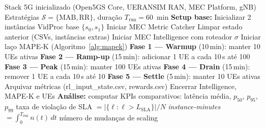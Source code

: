

\begin{algorithm}[t]
\caption{Procedimento experimental para comparação MAB vs.\ Round Robin}
\label{alg:experiment}
\begin{algorithmic}[1]
\Require Stack 5G inicializado (Open5GS Core, UERANSIM RAN, MEC Platform, gNB)
\Require Estratégias $\mathcal{S} = \{\text{MAB}, \text{RR}\}$, duração $T_{\text{run}} = 60$~min
\Statex
\State \textbf{Setup base:}
\State Inicializar 2 instâncias VidProc base $\{s_0, s_1\}$
\State Iniciar MEC Metric Catcher
\Statex
{}
    \State Limpar estado anterior (CSVs, instâncias extras)
    \State Iniciar MEC Intelligence com roteador $\sigma$
    \State Iniciar laço MAPE-K (Algoritmo~\ref{alg:mapek})
    \Statex
    \State \textbf{Fase 1 — Warmup} (10\,min): manter 10 UEs ativas
    \State \textbf{Fase 2 — Ramp-up} (15\,min): adicionar 1 UE a cada 10\,s até 100
    \State \textbf{Fase 3 — Peak} (15\,min): manter 100 UEs ativas
    \State \textbf{Fase 4 — Drain} (15\,min): remover 1 UE a cada 10\,s até 10
    \State \textbf{Fase 5 — Settle} (5\,min): manter 10 UEs ativas
    \Statex
    \State Arquivar métricas (rl\_input\_state.csv, rewards.csv)
    \State Encerrar Intelligence, MAPE-K e UEs
\EndFor
\Statex
\State \textbf{Análise:} computar KPIs comparativos:
\State \quad latência média, $p_{50}$, $p_{95}$, $p_{99}$
\State \quad taxa de violação de SLA $= |\{\ell : \ell > L_{\text{SLA}}\}| / N$
\State \quad \emph{instance-minutes} $= \int_0^{T_{\text{run}}} n(t)\, dt$
\State \quad número de mudanças de scaling
\end{algorithmic}
\end{algorithm}


